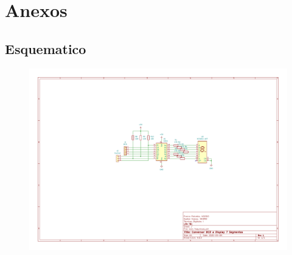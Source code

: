 \chapter{Anexos}
  \begin{landscape}
    \pagestyle{empty}
    \section{Esquematico}\label{annex:schematic}
      \begin{figure}[H]
      \centering
        \includegraphics[height=\textwidth]{annex/bcd-7seg_sch.pdf}
      \end{figure}
  \end{landscape}
